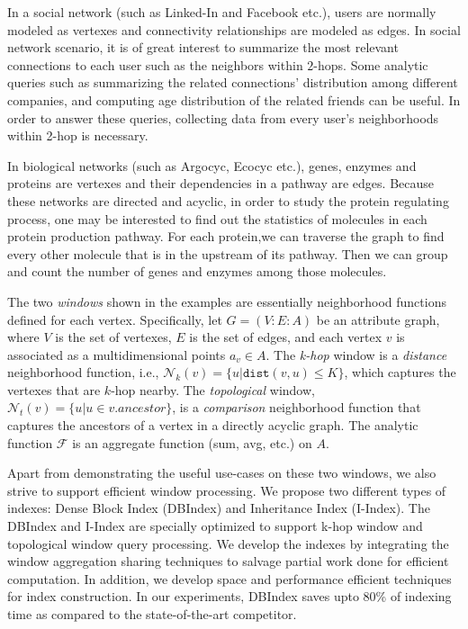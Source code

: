 \begin{example}
In a social network (such as Linked-In and Facebook etc.), users are normally modeled as vertexes and connectivity relationships are modeled as edges. In social network scenario, it is of great interest to summarize the most relevant connections to each user such as the neighbors within $2$-hops. Some analytic queries such as summarizing the related connections' distribution among different companies, and computing age distribution of the related friends can be useful. In order to answer these queries, collecting data from every user's neighborhoods within 2-hop is necessary.
\end{example}
\begin{example}
In biological networks (such as Argocyc, Ecocyc etc.), genes, enzymes and proteins are vertexes and their
dependencies in a pathway are edges. Because these networks are directed and acyclic, 
in order to study the protein regulating process, one may be interested to find out the statistics of molecules in each protein production pathway. For each protein,we can traverse the graph to find every other 
 molecule that is in the upstream of its pathway. Then we can group and 
 count the number of genes and enzymes among those molecules.
\end{example}

The two \emph{windows} shown in the examples are essentially neighborhood functions defined for each vertex. Specifically, let $G=(V:E:A)$ be an attribute graph, where $V$ is the set of vertexes, $E$ is the set of edges, and each vertex $v$ is associated as a multidimensional points $a_v \in A$.
The \emph{k-hop} window is a \emph{distance} neighborhood function, 
i.e., $\mathcal{N}_k(v)= \{u|\mathtt{dist}(v,u) \leq K\}$, 
which captures the vertexes that are $k$-hop nearby. 
The \emph{topological} window,  $\mathcal{N}_t(v)= \{u | u \in v.ancestor\}$,
is a \emph{comparison} neighborhood function that captures
the ancestors of a vertex in a directly acyclic graph.  The analytic function $\mathcal{F}$ is an aggregate function (sum, avg, etc.) on $A$.

Apart from demonstrating the useful use-cases on these two windows, we also strive to support efficient window processing. We propose
two different types of indexes: Dense Block Index (DBIndex)
and Inheritance Index (I-Index). The DBIndex and I-Index
are specially optimized to support k-hop window and topological
window query processing. We develop the indexes
by integrating the window aggregation sharing techniques
to salvage partial work done for efficient computation. 
In addition, we develop space and performance efficient techniques
for index construction. In our experiments, DBIndex saves upto 80\%
of indexing time as compared to the state-of-the-art competitor.


